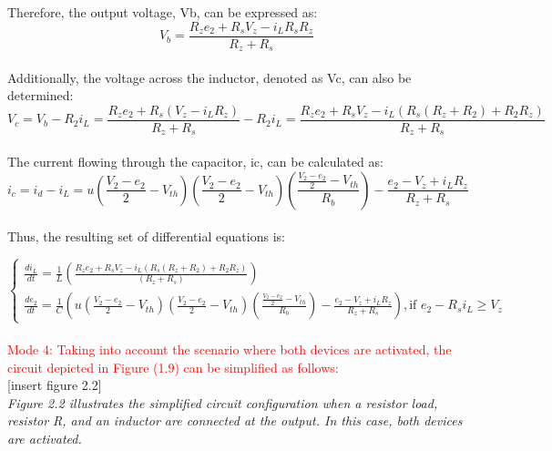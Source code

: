 Therefore, the output voltage, Vb, can be expressed as:\\

\begin{equation}
    V_b=\frac{R_ze_2+R_sV_z-i_LR_sR_z}{R_z+R_s}
\end{equation}\\

Additionally, the voltage across the inductor, denoted as Vc, can also be determined:\\

\begin{equation}
    V_c=V_b-R_2i_L=\frac{R_ze_2+R_s(V_z-i_LR_z)}{R_z+R_s}-R_2i_L=\frac{R_ze_2+R_sV_z-i_L(R_s(R_z+R_2)+R_2R_z)}{R_z+R_s}
\end{equation}\\

The current flowing through the capacitor, ic, can be calculated as:\\

\begin{equation}
    i_c=i_d-i_L=u(\frac{V_2-e_2}{2}-V_{th})(\frac{V_2-e_2}{2}-V_{th})(\frac{\frac{V_2-e_2}{2}-V_{th}}{R_b})-\frac{e_2-V_z+i_LR_z}{R_z+R_s}
\end{equation}\\

Thus, the resulting set of differential equations is:

\begin{equation}
    \begin{cases}
        \frac{di_L}{dt}=\frac{1}{L}(\frac{R_ze_2+R_sV_z-i_L(R_s(R_z+R_2)+R_2R_z)}{(R_z+R_s)})\\
        \frac{de_2}{dt}=\frac{1}{C}(u(\frac{V_2-e_2}{2}-V_{th})(\frac{V_2-e_2}{2}-V_{th})(\frac{\frac{V_2-e_2}{2}-V_{th}}{R_b})-\frac{e_2-V_z+i_LR_z}{R_z+R_s}),  \text{if } e_2-R_si_L \geq V_z
    \end{cases}
\end{equation}\\

\large\textcolor{red}{Mode 4: Taking into account the scenario where both devices are activated, the circuit depicted in Figure (1.9) can be simplified as follows:}\\

[insert figure 2.2]\\

\emph{Figure 2.2 illustrates the simplified circuit configuration when a resistor load, resistor R, and an inductor are connected at the output. In this case, both devices are activated.}\\

